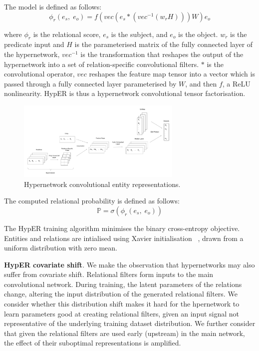 \noindent The model is defined as follows: 
\begin{equation}
	\phi_r(e_s, \; e_o) = f(vec(e_s * (vec^{-1}(w_rH)))W)e_o
\end{equation}

\noindent where $ \phi_r $ is the relational score, $ e_s $ is the subject, and $ e_o $ is the object. $ w_r $ is the predicate input and $ H $ is the parameterised matrix of the fully connected layer of the hypernetwork, $ vec^{-1} $ is the transformation that reshapes the output of the hypernetwork into a set of relation-specific convolutional filters. $ * $ is the convolutional operator, $ vec $ reshapes the feature map tensor into a vector which is passed through a fully connected layer parameterised by $ W $, and then $ f $, a ReLU nonlinearity. HypER is thus a hypernetwork convolutional tensor factorisation. 

\begin{figure}[H]
   	\centering
    	\includegraphics[width=0.7\textwidth, height=0.5\textwidth]{hyper_neural_tensor_network_final}
	\caption{Hypernetwork convolutional entity representations.}
\end{figure}

\noindent The computed relational probability is defined as follows: 
\begin{equation}
	\mathbb{P} = \sigma(\phi_r(e_s, \; e_o)) 
\end{equation}

\noindent The HypER training algorithm minimises the binary cross-entropy objective. Entities and relations are intialised using Xavier initialisation \unskip ~\citep{glorot2010understanding}, drawn from a uniform distribution with zero mean. \par

\noindent \textbf{HypER covariate shift}. We make the observation that hypernetworks may also suffer from covariate shift. Relational filters form inputs to the main convolutional network. During training, the latent parameters of the relations change, altering the input distribution of the generated relational filters. We consider whether this distribution shift makes it hard for the hpernetwork to learn parameters good at creating relational filters, given an input signal not representative of the underlying training dataset distribution. We further consider that given the relational filters are used early (upstream) in the main network, the effect of their suboptimal representations is amplified. \par

